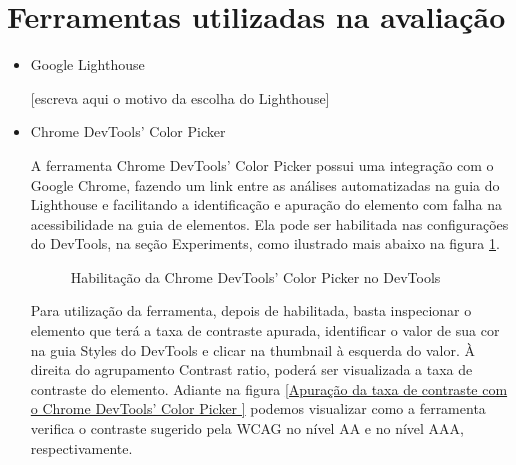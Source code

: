 \documentclass[
	12pt,				%
	openright,			%
	oneside,			%
	a4paper,			%
	chapter=TITLE,		%
	section=TITLE,		%
	subsection=TITLE,	%
	subsubsection=TITLE,%
	english,			%
	brazil				%
	]{abntex2}
\theoremstyle{definition}
\begin{document}
\section{Ferramentas utilizadas na avaliação}

\begin{itemize}

    \item Google Lighthouse
    
[escreva aqui o motivo da escolha do Lighthouse]
    
    \item Chrome DevTools’ Color Picker
    
A ferramenta Chrome DevTools’ Color Picker possui uma integração com o Google Chrome, fazendo um link entre as análises automatizadas na guia do Lighthouse e facilitando a identificação e apuração do elemento com falha na acessibilidade na guia de elementos. Ela pode ser habilitada nas configurações do DevTools, na seção Experiments, como ilustrado mais abaixo na figura \ref{Habilitação da Chrome DevTools’ Color Picker no DevTools}.

\begin{figure}[!h]
\centering
\caption{Habilitação da Chrome DevTools’ Color Picker no DevTools}
\label{Habilitação da Chrome DevTools’ Color Picker no DevTools}
\end{figure}

Para utilização da ferramenta, depois de habilitada, basta inspecionar o elemento que terá a taxa de contraste apurada, identificar o valor de sua cor na guia Styles do DevTools e clicar na thumbnail à esquerda do valor. À direita do agrupamento Contrast ratio, poderá ser visualizada a taxa de contraste do elemento. Adiante na figura \ref{Apuração da taxa de contraste com o Chrome DevTools’ Color Picker } podemos visualizar como a ferramenta verifica o contraste sugerido pela WCAG no nível AA e no nível AAA, respectivamente.


\end{itemize}
\end{document}
